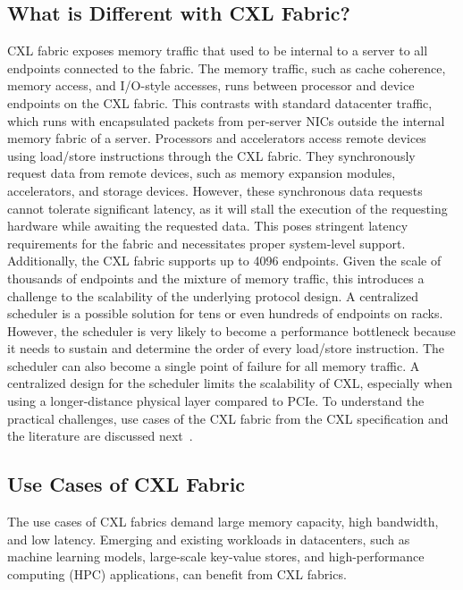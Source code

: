 \subsection{What is Different with CXL Fabric?}
CXL fabric exposes memory traffic that used to be internal to a server to all endpoints connected to the fabric.
%
The memory traffic, such as cache coherence, memory access, and I/O-style accesses, runs between processor and device endpoints on the CXL fabric.
%
This contrasts with standard datacenter traffic, which runs with encapsulated packets from per-server NICs outside the internal memory fabric of a server.
%
Processors and accelerators access remote devices using load/store instructions through the CXL fabric.
%
They synchronously request data from remote devices, such as memory expansion modules, accelerators, and storage devices.
%
However, these synchronous data requests cannot tolerate significant latency, as it will stall the execution of the requesting hardware while awaiting the requested data.
%
This poses stringent latency requirements for the fabric and necessitates proper system-level support.
%
Additionally, the CXL fabric supports up to 4096 endpoints.
%
Given the scale of thousands of endpoints and the mixture of memory traffic, this introduces a challenge to the scalability of the underlying protocol design.
%
A centralized scheduler is a possible solution for tens or even hundreds of endpoints on racks.
%
However, the scheduler is very likely to become a performance bottleneck because it needs to sustain and determine the order of every load/store instruction.
%
The scheduler can also become a single point of failure for all memory traffic.
%
A centralized design for the scheduler limits the scalability of CXL, especially when using a longer-distance physical layer compared to PCIe.
%
%
To understand the practical challenges, use cases of the CXL fabric from the CXL specification and the literature are discussed next~\cite{cxl-3-0-spec, directcxl:atc:2022, pond:asplos:2023}.
%

\subsection{Use Cases of CXL Fabric}
\label{aurelia:subsec:use-cases}
The use cases of CXL fabrics demand large memory capacity, high bandwidth, and low latency.
%
Emerging and existing workloads in datacenters, such as machine learning models, 
large-scale key-value stores, and high-performance computing (HPC) applications, can benefit from CXL fabrics.   

